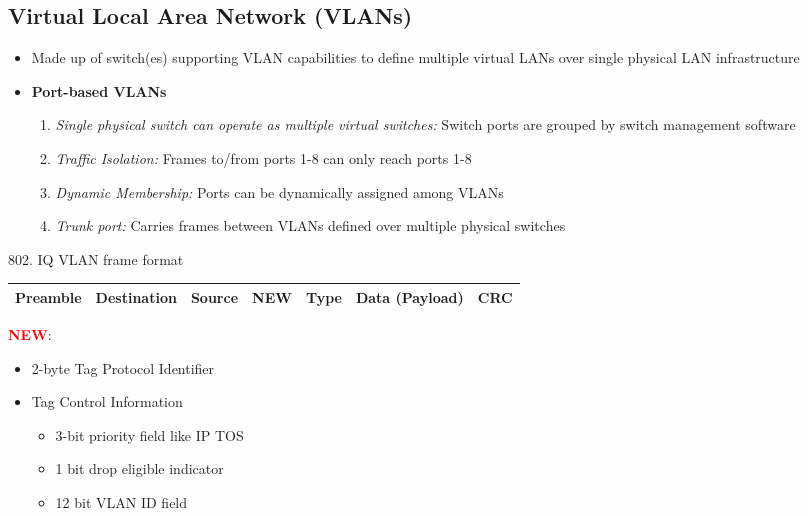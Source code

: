 \documentclass[a4paper]{article}
\begin{document}
\subsection{Virtual Local Area Network (VLANs)}
\begin{itemize}
    \item Made up of switch(es) supporting VLAN capabilities to define multiple virtual LANs over single physical LAN infrastructure
    \item \textbf{Port-based VLANs}
    \begin{enumerate}[label=\roman*.]
        \item \textit{Single physical switch can operate as multiple virtual switches:} Switch ports are grouped by switch management software
        \item \textit{Traffic Isolation:} Frames to/from ports 1-8 can only reach ports 1-8
        \item \textit{Dynamic Membership:} Ports can be dynamically assigned among VLANs
        \item \textit{Trunk port:} Carries frames between VLANs defined over multiple physical switches
    \end{enumerate}
\end{itemize}
802. IQ VLAN frame format
\begin{table}[H]
    \centering
    \begin{tabular}{|l|l|l|l|l|l|l|}
    \hline
    \textbf{Preamble} & \textbf{Destination} & \textbf{Source} & {\color[HTML]{FE0000} \textbf{NEW}} & \textbf{Type} & \textbf{Data (Payload)} & \textbf{CRC} \\ \hline
    \end{tabular}
\end{table}
\noindent\textbf{\textcolor{red}{NEW}}:
\begin{itemize}
    \item 2-byte Tag Protocol Identifier
    \item Tag Control Information
    \begin{itemize}[label=$\circ$]
        \item 3-bit priority field like IP TOS
        \item 1 bit drop eligible indicator
        \item 12 bit VLAN ID field
    \end{itemize}
\end{itemize}
\end{document}
